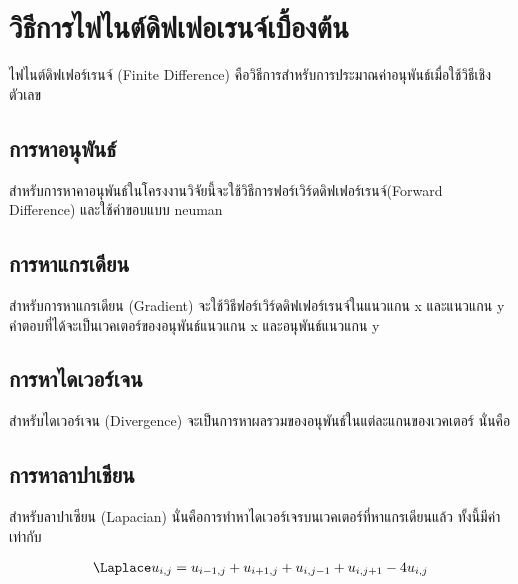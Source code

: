 \section{วิธีการไฟไนต์ดิฟเฟอเรนจ์เบื้องต้น}
ไฟไนต์ดิฟเฟอร์เรนจ์ (Finite Difference) คือวิธีการสำหรับการประมาณค่าอนุพันธ์เมื่อใช้วิธีเชิงตัวเลข

\subsection{การหาอนุพันธ์}
สำหรับการหาคาอนุพันธ์ในโครงงานวิจัยนี้จะใช้วิธีการฟอร์เวิร์ดดิฟเฟอร์เรนจ์(Forward Difference) และใช้ค่าขอบแบบ neuman

\subsection{การหาแกรเดียน}
สำหรับการหาแกรเดียน (Gradient) จะใช้วิธีฟอร์เวิร์ดดิฟเฟอร์เรนจ์ในแนวแกน x และแนวแกน y คำตอบที่ได้จะเป็นเวคเตอร์ของอนุพันธ์แนวแกน x และอนุพันธ์แนวแกน y


\subsection{การหาไดเวอร์เจน}
สำหรับไดเวอร์เจน (Divergence) จะเป็นการหาผลรวมของอนุพันธ์ในแต่ละแกนของเวคเตอร์ นั่นคือ 

\subsection{การหาลาปาเชียน}
สำหรับลาปาเซียน (Lapacian) นั่นคือการทำหาไดเวอร์เจรบนเวคเตอร์ที่หาแกรเดียนแล้ว ทั้งนี้มีค่าเท่ากับ

\begin{align*}
    \Laplace u_{i,j} = u_{i-1,j} + u_{i+1,j} + u_{i,j-1} + u_{i,j+1} - 4u_{i,j} 
\end{align*}